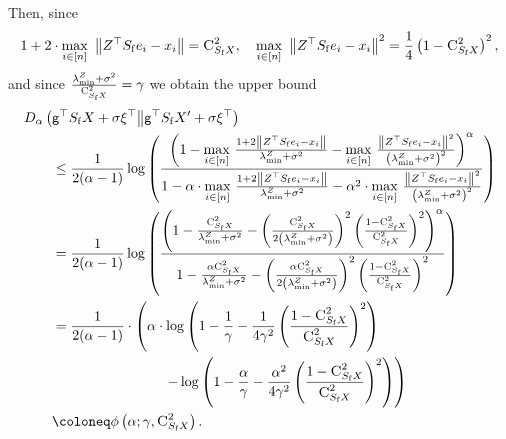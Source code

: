 \documentclass[11pt]{article}
\theoremstyle{definition}
\theoremstyle{plain}
\newcommand{\Norm}[1]{\left\| #1 \right\|}
\providecommand{\norm}[1]{\Norm{#1}}
\providecommand{\KLDA}[2]{{D_{\alpha} \left( #1 \middle\| #2 \right)}}
\begin{document}
Then, since 
\begin{align}
    1 + 2\cdot \underset{i\in[n]}{\max} \ \norm{Z^{\top}S_{\mathrm{f}}e_i - x_i} = \textsc{C}^2_{S_{\mathrm{f}}X}, \ \ \ \underset{i\in[n]}{\max} \ \norm{Z^{\top}S_{\mathrm{f}}e_i - x_i}^2 = \frac{1}{4}\left(1 - \textsc{C}^2_{S_{\mathrm{f}}X}\right)^2, 
\end{align}
and since $\frac{\lambda^{Z}_{\min} + \sigma^2}{\textsc{C}^2_{S_{\mathrm{f}}X}} = \gamma$ we obtain the upper bound 
\begin{align}
    &\KLDA{\mathsf{g}^{\top}S_{\mathrm{f}}X + \sigma\xi^{\top}}{\mathsf{g}^{\top}S_{\mathrm{f}}X' + \sigma\xi^{\top}}\\ 
    &\qquad\leq \frac{1}{2(\alpha - 1)}\log\left(\frac{\left(1 - \underset{i\in[n]}{\max} \ \tfrac{1 + 2\norm{Z^{\top}S_{\mathrm{f}}e_i - x_i}}{\lambda^{Z}_{\min} + \sigma^2} - \underset{i\in[n]}{\max} \ \tfrac{\norm{Z^{\top}S_{\mathrm{f}}e_i - x_i}^2}{\left(\lambda^{Z}_{\min} + \sigma^2\right)^2}\right)^{\alpha}}{1 - \alpha \cdot \underset{i\in[n]}{\max} \ \tfrac{1 + 2\norm{Z^{\top}S_{\mathrm{f}}e_i - x_i}}{\lambda^{Z}_{\min} + \sigma^2} - \alpha^2\cdot \underset{i\in[n]}{\max} \ \tfrac{\norm{Z^{\top}S_{\mathrm{f}}e_i - x_i}^2}{\left(\lambda^{Z}_{\min} + \sigma^2\right)^2}}\right)\\
    &\qquad = \frac{1}{2(\alpha - 1)}\log\left(\frac{\left(1 - \tfrac{\textsc{C}^2_{S_{\mathrm{f}}X}}{\lambda^{Z}_{\min} + \sigma^2} - \left(\tfrac{\textsc{C}^2_{S_{\mathrm{f}}X}}{2\left(\lambda^{Z}_{\min} + \sigma^2\right)}\right)^2\left(\tfrac{1 - \textsc{C}^2_{S_{\mathrm{f}}X}}{\textsc{C}^2_{S_{\mathrm{f}}X}}\right)^2\right)^{\alpha}}{1 - \tfrac{\alpha \textsc{C}^2_{S_{\mathrm{f}}X}}{\lambda^{Z}_{\min} + \sigma^2} - \left(\tfrac{\alpha \textsc{C}^2_{S_{\mathrm{f}}X}}{2\left(\lambda^{Z}_{\min} + \sigma^2\right)}\right)^2\left(\tfrac{1-\textsc{C}^2_{S_{\mathrm{f}}X}}{\textsc{C}^2_{S_{\mathrm{f}}X}}\right)^2}\right)\\
    &\qquad = \frac{1}{2(\alpha - 1)}\cdot \left(\alpha\cdot \log\left(1 - \frac{1}{\gamma} - \frac{1}{4\gamma^2}\left(\frac{1 - \textsc{C}^2_{S_{\mathrm{f}}X}}{\textsc{C}^2_{S_{\mathrm{f}}X}}\right)^2\right)\right.\\
    & \qquad\qquad\qquad\qquad\qquad \left.- \log\left(1 - \frac{\alpha}{\gamma} - \frac{\alpha^2}{4\gamma^2} \left(\frac{1 - \textsc{C}^2_{S_{\mathrm{f}}X}}{\textsc{C}^2_{S_{\mathrm{f}}X}}\right)^2\right)\right)\\
    &\qquad\coloneq \phi\left(\alpha; \gamma, \textsc{C}^2_{S_{\mathrm{f}}X}\right). 
\end{align}
\end{document}
